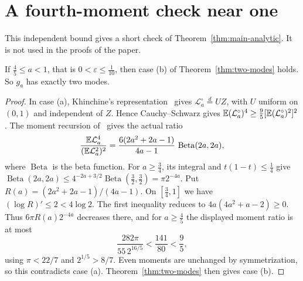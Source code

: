 \section{A fourth-moment check near one}
This independent bound gives a short check of
Theorem~\ref{thm:main-analytic}. It is not used in the proofs of the paper.

\begin{theorem}\label{thm:two-modes-near-one}
If $\frac45\le a<1$, that is $0<\varepsilon\le\frac1{10}$, then case (b)
of Theorem~\ref{thm:two-modes} holds. So $g_a$ has exactly two modes.
\end{theorem}

\begin{proof}
In case (a), Khinchine's representation~\cite{dj1988} gives
$\mathcal L^\circ_a\overset{d}=UZ$, with $U$ uniform on $(0,1)$ and
independent of $Z$. Hence Cauchy--Schwarz gives
$\mathbb{E}(\mathcal L^\circ_a)^4\ge\frac95[\mathbb{E}(\mathcal L^\circ_a)^2]^2$.
The moment recursion of~\cite[Theorem~1.4]{glr2026} gives the actual ratio
\[
 \frac{\mathbb{E}\mathcal L_a^4}{(\mathbb{E}\mathcal L_a^2)^2}
 =\frac{6(2a^2+2a-1)}{4a-1}\,\operatorname{Beta}(2a,2a),
\]
where $\operatorname{Beta}$ is the beta function. For $a\ge\frac34$, its integral and
$t(1-t)\le\frac14$ give
$\operatorname{Beta}(2a,2a)\le4^{-2a+3/2}\operatorname{Beta}(\frac32,\frac32)=\pi2^{-4a}$.
Put $R(a)=(2a^2+2a-1)/(4a-1)$. On $[\frac34,1]$ we have
$(\log R)'\le2<4\log2$. The first inequality reduces to
$4a(4a^2+a-2)\ge0$. Thus $6\pi R(a)2^{-4a}$ decreases there, and for
$a\ge\frac45$ the displayed moment ratio is at most
\[
 \frac{282\pi}{55\,2^{16/5}}
 <\frac{141}{80}<\frac95,
\]
using $\pi<22/7$ and $2^{1/5}>8/7$. Even moments are unchanged by
symmetrization, so this contradicts case (a). Theorem~\ref{thm:two-modes}
then gives case (b).
\end{proof}
